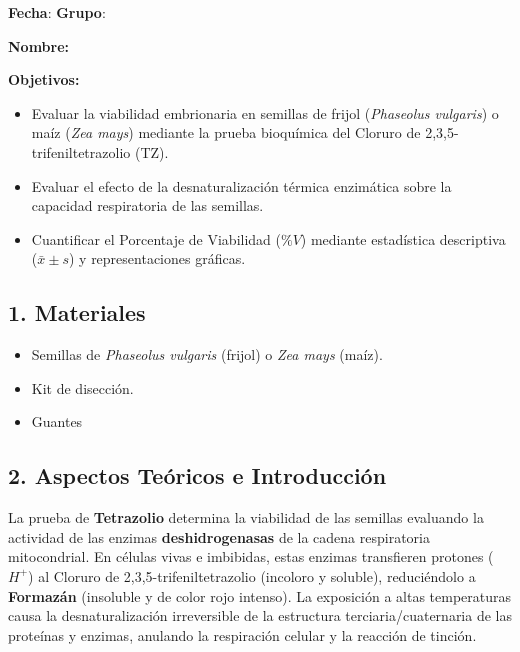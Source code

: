 \documentclass[
  spanish,
  10pt,
  letterpaper,
  twocolumn]{article}
\title{\vspace{-1.5em}{\Huge \textbf{Práctica 4 -- Viabilidad de
Semillas}}\vspace{-1.5em}}
\date{}
\providecommand{\tightlist}{%
  \setlength{\itemsep}{0pt}\setlength{\parskip}{0pt}}
\begin{document}
\maketitle


\textbf{Fecha}: \hrulefill \hfill \textbf{Grupo}: \hrulefill

\textbf{Nombre:} \hrulefill

\textbf{Objetivos:}

\begin{itemize}
\tightlist
\item
  Evaluar la viabilidad embrionaria en semillas de frijol
  (\emph{Phaseolus vulgaris}) o maíz (\emph{Zea mays}) mediante la
  prueba bioquímica del Cloruro de 2,3,5-trifeniltetrazolio (TZ).
\item
  Evaluar el efecto de la desnaturalización térmica enzimática sobre la
  capacidad respiratoria de las semillas.
\item
  Cuantificar el Porcentaje de Viabilidad (\(\%V\)) mediante estadística
  descriptiva (\(\bar{x} \pm s\)) y representaciones gráficas.
\end{itemize}

\subsection{1. Materiales}\label{materiales}

\begin{itemize}
\tightlist
\item
  Semillas de \emph{Phaseolus vulgaris} (frijol) o \emph{Zea mays}
  (maíz).
\item
  Kit de disección.
\item
  Guantes
\end{itemize}

\subsection{2. Aspectos Teóricos e
Introducción}\label{aspectos-teuxf3ricos-e-introducciuxf3n}

La prueba de \textbf{Tetrazolio} determina la viabilidad de las semillas
evaluando la actividad de las enzimas \textbf{deshidrogenasas} de la
cadena respiratoria mitocondrial. En células vivas e imbibidas, estas
enzimas transfieren protones (\(H^+\)) al Cloruro de
2,3,5-trifeniltetrazolio (incoloro y soluble), reduciéndolo a
\textbf{Formazán} (insoluble y de color rojo intenso). La exposición a
altas temperaturas causa la desnaturalización irreversible de la
estructura terciaria/cuaternaria de las proteínas y enzimas, anulando la
respiración celular y la reacción de tinción.
\end{document}

